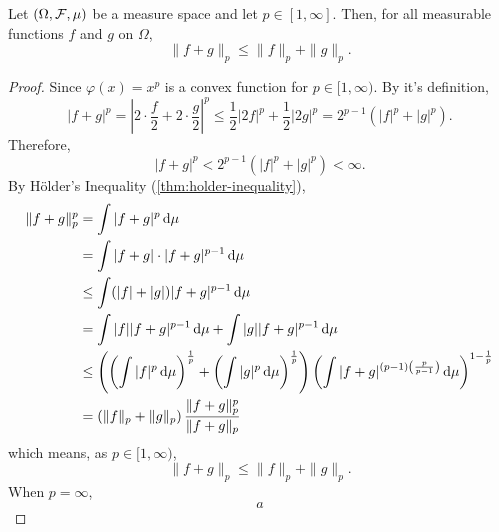 \begin{theorem} \label{thm:minkowski-inequality}
	Let $(\Omega,{\mathcal F},\mu)$ be a measure space and let $p\in[1,\infty]$. Then, for all measurable functions $f$ and $g$ on $\Omega$,
	\begin{equation}
		\|f+g\|_{p} \leq\|f\|_{p}+\|g\|_{p}.
	\end{equation}
\end{theorem}

\begin{proof}
	Since $\varphi(x)=x^p$ is a convex function for $p\in[1,\infty)$. By it's definition,
	\begin{equation*}
		|f+g|^{p}=\left|2\cdot\frac{f}{2}+2\cdot\frac{g}{2}\right|^{p}\leq \frac{1}{2}|2f|^p+\frac{1}{2}|2g|^p=2^{p-1}\left(|f|^{p}+|g|^{p}\right).
	\end{equation*}
	Therefore,
	\begin{equation*}
		|f+g|^{p}<2^{p-1}\left(|f|^{p}+|g|^{p}\right)<\infty.
	\end{equation*}
	By H\"older's Inequality (\ref{thm:holder-inequality}),
	\begin{equation*}
		\begin{aligned}
			\|f+g\|_{p}^{p} & =\int|f+g|^{p}\dif\mu                                                                                                                                                                             \\
			                & =\int|f+g| \cdot|f+g|^{p-1}\dif \mu                                                                                                                                                               \\
			                & \leq \int(|f|+|g|)|f+g|^{p-1}\dif\mu                                                                                                                                                              \\
			                & =\int|f||f+g|^{p-1}\dif\mu+\int|g||f+g|^{p-1}\dif\mu                                                                                                                                              \\
			                & \leq\left(\left(\int|f|^{p} \dif \mu\right)^{\frac{1}{p}}+\left(\int|g|^{p} \dif \mu\right)^{\frac{1}{p}}\right)\left(\int|f+g|^{(p-1)\left(\frac{p}{p-1}\right)} \dif \mu\right)^{1-\frac{1}{p}} \\
			                & =\left(\|f\|_{p}+\|g\|_{p}\right) \frac{\|f+g\|_{p}^{p}}{\|f+g\|_{p}}
		\end{aligned}
	\end{equation*}
	which means, as $p\in[1,\infty)$,
	\begin{equation*}
		\|f+g\|_{p} \leq\|f\|_{p}+\|g\|_{p}.
	\end{equation*}
	When $p=\infty$,
	\begin{equation*}
		a
	\end{equation*}
\end{proof}


